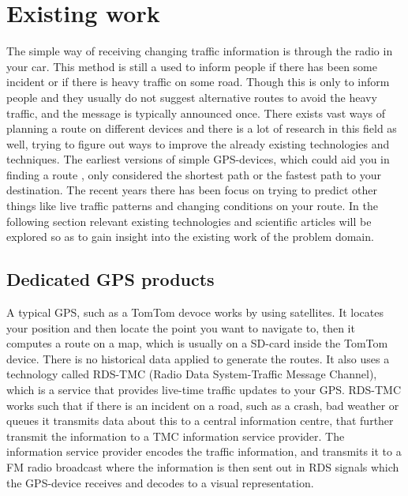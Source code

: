 \section{Existing work}
The simple way of receiving changing traffic information is through the radio in your car. This method is still a used to inform people if there has been some incident or if there is heavy traffic on some road. Though this is only to inform people and they usually do not suggest alternative routes to avoid the heavy traffic, and the message is typically announced once.  
There exists vast ways of planning a route on different devices and there is  a lot of research in this field as well, trying to figure out ways to improve the already existing technologies and techniques. The earliest versions of simple GPS-devices, which could aid you in finding a route , only considered the shortest path or the fastest path to your destination. 
The recent years there has been focus on trying to predict other things like live traffic patterns and changing conditions on your route.
In the following section relevant existing technologies and scientific articles will be explored so as to gain insight into the existing work of the problem domain.
\subsection{Dedicated GPS products}
A typical GPS, such as a TomTom devoce works by using satellites. It locates your position and then locate the point you want to navigate to, then it computes a route on a map, which is usually on a SD-card inside the TomTom device. There is no historical data applied to generate the routes.
It also uses a technology called RDS-TMC (Radio Data System-Traffic Message Channel), which is a service that provides live-time traffic updates to your GPS. RDS-TMC works such that if there is an incident on a road, such as a crash, bad weather or queues it transmits data about this to a central information centre, that further transmit the information to a TMC information service provider. The information service provider encodes the traffic information, and transmits it to a FM radio broadcast where the information is then sent out in RDS signals which the GPS-device receives and decodes to a visual representation.

